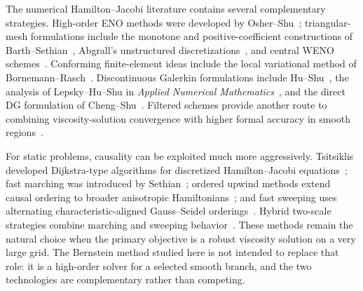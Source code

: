 \documentclass[preprint,12pt]{elsarticle}
\begin{document}
The numerical Hamilton--Jacobi literature contains several complementary strategies.  High-order ENO methods were developed by Osher--Shu~\cite{OsherShu1991}; triangular-mesh formulations include the monotone and positive-coefficient constructions of Barth--Sethian~\cite{BarthSethian1998}, Abgrall's unstructured discretizations~\cite{Abgrall1996,Abgrall2009}, and central WENO schemes~\cite{LevyNayakShuZhang2006}.  Conforming finite-element ideas include the local variational method of Bornemann--Rasch~\cite{BornemannRasch2006}.  Discontinuous Galerkin formulations include Hu--Shu~\cite{HuShu1999}, the analysis of Lepsky--Hu--Shu in \emph{Applied Numerical Mathematics}~\cite{LepskyHuShu2000}, and the direct DG formulation of Cheng--Shu~\cite{ChengShu2007}.  Filtered schemes provide another route to combining viscosity-solution convergence with higher formal accuracy in smooth regions~\cite{ObermanSalvador2015}.

For static problems, causality can be exploited much more aggressively.  Tsitsiklis developed Dijkstra-type algorithms for discretized Hamilton--Jacobi equations~\cite{Tsitsiklis1995}; fast marching was introduced by Sethian~\cite{Sethian1996,Sethian1999}; ordered upwind methods extend causal ordering to broader anisotropic Hamiltonians~\cite{SethianVladimirsky2003}; and fast sweeping uses alternating characteristic-aligned Gauss--Seidel orderings~\cite{Zhao2005,KaoOsherTsai2005,ZhangZhaoQian2006,QianZhangZhao2007}.  Hybrid two-scale strategies combine marching and sweeping behavior~\cite{ChaconVladimirsky2012}.  These methods remain the natural choice when the primary objective is a robust viscosity solution on a very large grid.  The Bernstein method studied here is not intended to replace that role: it is a high-order solver for a selected smooth branch, and the two technologies are complementary rather than competing.
\end{document}
